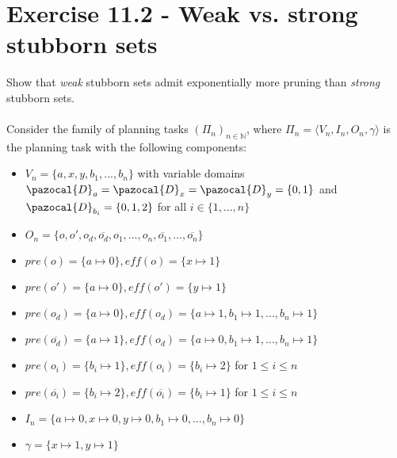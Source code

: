 \documentclass[11pt,a4paper]{article}
\begin{document}
\section*{Exercise 11.2 - Weak vs. strong stubborn sets}
Show that \emph{weak} stubborn sets admit exponentially more pruning than
\emph{strong} stubborn sets.\\\\
Consider the family of planning tasks $(\Pi_n)_{n \in \mathbb{N}}$, where $\Pi_n = \langle V_n, I_n,O_n, \gamma \rangle$ is the planning task with the following components:
\begin{itemize}
	\item $V_n = \{a, x, y, b_1, ..., b_n\}$ with variable domains $\pazocal{D}_a = \pazocal{D}_x = \pazocal{D}_y = \{0, 1\}$ and $\pazocal{D}_{b_i} = \{0,1,2\}$ for all $i \in \{1, ..., n\}$
	\item $O_n = \{o, o', o_d, \overline{o_d}, o_1, ..., o_n, \overline{o_1}, ...,\overline{o_n}\}$
	\item $pre(o) = \{ a \mapsto 0 \}, eff(o) = \{ x \mapsto 1  \}$
	\item $pre(o') = \{ a \mapsto 0 \}, eff(o') = \{ y \mapsto 1  \}$
	\item $pre(o_d) = \{ a \mapsto 0 \}, eff(o_d) = \{ a \mapsto 1 , b_1 \mapsto 1, ..., b_n \mapsto 1 \}$
	\item $pre(\overline{o_d}) = \{ a \mapsto 1 \}, eff(o_d) = \{ a \mapsto 0 , b_1 \mapsto 1, ..., b_n \mapsto 1 \}$
	\item $pre(o_i) = \{b_i \mapsto 1\}, eff(o_i) =\{b_i \mapsto 2 \}$ for $1 \leq i \leq n$
	\item $pre(\overline{o_i}) = \{b_i \mapsto 2\}, eff(\overline{o_i}) =\{b_i \mapsto 1 \}$ for $1 \leq i \leq n$
	\item $I_n = \{a \mapsto 0, x \mapsto 0, y \mapsto 0, b_1 \mapsto 0, ..., b_n \mapsto 0\}$
	\item $\gamma = \{ x \mapsto 1, y \mapsto 1\}$
\end{itemize}
\end{document}
